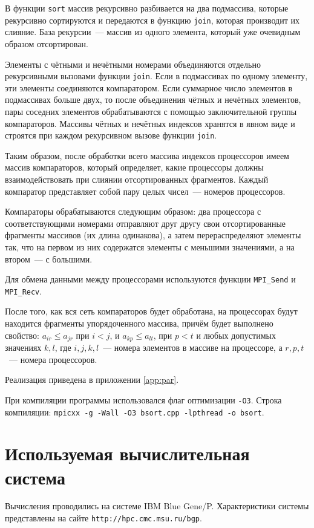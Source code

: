 \documentclass[oneside,final,14pt]{extreport}
\begin{document}
В функции \texttt{sort} массив рекурсивно разбивается на два подмассива,
которые рекурсивно сортируются и передаются в функцию \texttt{join}, которая
производит их слияние. База рекурсии~--- массив из одного элемента,
который уже очевидным образом отсортирован.

Элементы с чётными и нечётными номерами объединяются отдельно рекурсивными
вызовами функции \texttt{join}. Если в подмассивах по одному элементу,
эти элементы соединяются компаратором. Если суммарное число элементов в
подмассивах больше двух, то после объединения чётных и нечётных элементов,
пары соседних элементов обрабатываются с помощью заключительной
группы компараторов. Массивы чётных и нечётных индексов хранятся в явном виде
и строятся при каждом рекурсивном вызове функции \texttt{join}.

Таким образом, после обработки всего массива индексов процессоров имеем
массив компараторов, который определяет, какие процессоры должны взаимодействовать
при слиянии отсортированных фрагментов. Каждый компаратор представляет собой
пару целых чисел~--- номеров процессоров.

Компараторы обрабатываются следующим образом: два процессора с соответствующими
номерами отправляют друг другу свои отсортированные фрагменты массивов (их
длина одинакова), а затем перераспределяют элементы так, что на первом из
них содержатся элементы с меньшими значениями, а на втором~--- с большими.

Для обмена данными между процессорами используются функции \texttt{MPI\_Send}
и \texttt{MPI\_Recv}.

После того, как вся сеть компараторов будет обработана, на процессорах
будут находится фрагменты упорядоченного массива, причём будет выполнено
свойство: $a_{ir} \leq a_{jr}$ при $i < j$, и $a_{kp} \leq a_{lt}$, при
$p < t$ и любых допустимых значениях $k, l$, где $i, j, k, l$~--- номера
элементов в массиве на процессоре, а $r, p, t$~--- номера процессоров.

Реализация приведена в приложении \ref{app:par}.

При компиляции программы использовался флаг оптимизации \texttt{-O3}.
Строка компиляции:
\verb|mpicxx -g -Wall -O3 bsort.cpp -lpthread -o bsort|.

\chapter*{Используемая вычислительная система}

Вычисления проводились на системе IBM Blue Gene/P.
Характеристики системы представлены на сайте \verb|http://hpc.cmc.msu.ru/bgp|.
\end{document}
